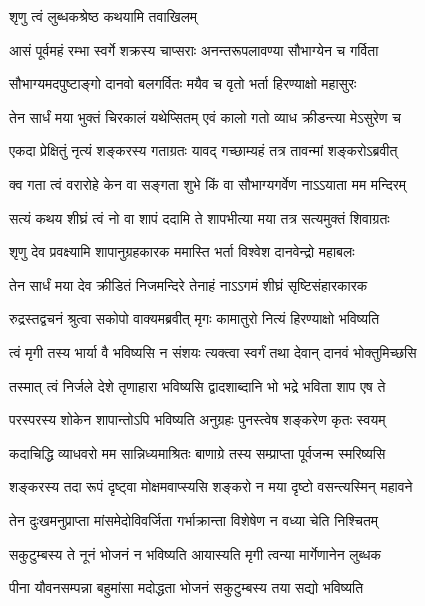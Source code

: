 \onelineshloka
{शृणु त्वं लुब्धकश्रेष्ठ कथयामि तवाखिलम्}%

\twolineshloka
{आसं पूर्वमहं रम्भा स्वर्गे शक्रस्य चाप्सराः}
{अनन्तरूपलावण्या सौभाग्येन च गर्विता}%

\twolineshloka
{सौभाग्यमदपुष्टाङ्गो दानवो बलगर्वितः}
{मयैव च वृतो भर्ता हिरण्याक्षो महासुरः}%

\twolineshloka
{तेन सार्धं मया भुक्तं चिरकालं यथेप्सितम्}
{एवं कालो गतो व्याध क्रीडन्त्या मेऽसुरेण च}%

\twolineshloka
{एकदा प्रेक्षितुं नृत्यं शङ्करस्य गताग्रतः}
{यावद् गच्छाम्यहं तत्र तावन्मां शङ्करोऽब्रवीत्}%

\twolineshloka
{क्व गता त्वं वरारोहे केन वा सङ्गता शुभे}
{किं वा सौभाग्यगर्वेण नाऽऽयाता मम मन्दिरम्}%

\twolineshloka
{सत्यं कथय शीघ्रं त्वं नो वा शापं ददामि ते}
{शापभीत्या मया तत्र सत्यमुक्तं शिवाग्रतः}%

\twolineshloka
{शृणु देव प्रवक्ष्यामि शापानुग्रहकारक}
{ममास्ति भर्ता विश्वेश दानवेन्द्रो महाबलः}%

\twolineshloka
{तेन सार्धं मया देव क्रीडितं निजमन्दिरे}
{तेनाहं नाऽऽगमं शीघ्रं सृष्टिसंहारकारक}%

\twolineshloka
{रुद्रस्तद्वचनं श्रुत्वा सकोपो वाक्यमब्रवीत्}
{मृगः कामातुरो नित्यं हिरण्याक्षो भविष्यति}%

\twolineshloka
{त्वं मृगी तस्य भार्या वै भविष्यसि न संशयः}
{त्यक्त्वा\footnotemark{} स्वर्गं तथा देवान् दानवं भोक्तुमिच्छसि}%

\twolineshloka
{तस्मात् त्वं निर्जले देशे तृणाहारा भविष्यसि}
{द्वादशाब्दानि भो भद्रे भविता शाप एष ते}%

\twolineshloka
{परस्परस्य शोकेन शापान्तोऽपि भविष्यति}
{अनुग्रहः पुनस्त्वेष शङ्करेण कृतः स्वयम्}%

\twolineshloka
{कदाचिद्धि व्याधवरो मम सान्निध्यमाश्रितः}
{बाणाग्रे तस्य सम्प्राप्ता पूर्वजन्म स्मरिष्यसि}%

\twolineshloka
{शङ्करस्य तदा रूपं दृष्ट्वा मोक्षमवाप्स्यसि}
{शङ्करो न मया दृष्टो वसन्त्यस्मिन् महावने}%

\twolineshloka
{तेन दुःखमनुप्राप्ता मांसमेदोविवर्जिता}
{गर्भाक्रान्ता विशेषेण न वध्या चेति निश्चितम्}%

\twolineshloka
{सकुटुम्बस्य ते नूनं भोजनं न भविष्यति}
{आयास्यति मृगी त्वन्या मार्गेणानेन लुब्धक}%

\twolineshloka
{पीना यौवनसम्पन्ना बहुमांसा मदोद्धता}
{भोजनं सकुटुम्बस्य तया सद्यो भविष्यति}%


